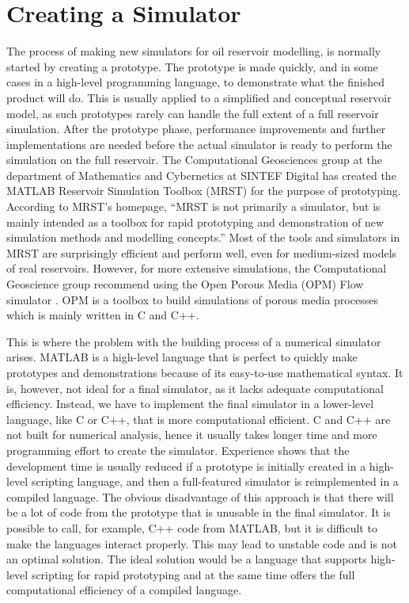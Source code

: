 \section{Creating a Simulator}
The process of making new simulators for oil reservoir modelling, is normally started by creating a prototype. The prototype is made quickly, and in some cases in a high-level programming language, to demonstrate what the finished product will do. This is usually applied to a simplified and conceptual reservoir model, as such prototypes rarely can handle the full extent of a full reservoir simulation. After the prototype phase, performance improvements and further implementations are needed before the actual simulator is ready to perform the simulation on the full reservoir. The Computational Geosciences group at the department of Mathematics and Cybernetics at SINTEF Digital has created the MATLAB Reservoir Simulation Toolbox (MRST) \emph{\citep{mrstHomepage}} for the  purpose of prototyping. According to MRST's homepage, \enquote{MRST is not primarily a simulator, but is mainly intended as a toolbox for rapid prototyping and demonstration of new simulation methods and modelling concepts.} Most of the tools and simulators in MRST are surprisingly efficient and perform well, even for medium-sized models of real reservoirs. However, for more extensive simulations, the Computational Geoscience group recommend using the Open Porous Media (OPM) Flow simulator \emph{\citep{opm}}. OPM is a toolbox to build simulations of porous media processes which is mainly written in C and C++. 

This is where the problem with the building process of a numerical simulator arises. MATLAB is a high-level language that is perfect to quickly make prototypes and demonstrations because of its easy-to-use mathematical syntax. It is, however, not ideal for a final simulator, as it lacks adequate computational efficiency. Instead, we have to implement the final simulator in a lower-level language, like C or C++, that is more computational efficient. C and C++ are not built for numerical analysis, hence it usually takes longer time and more programming effort to create the simulator. Experience shows that the development time is usually reduced if a prototype is initially created in a high-level scripting language, and then a full-featured simulator is reimplemented in a compiled language. The obvious disadvantage of this approach is that there will be a lot of code from the prototype that is unusable in the final simulator. It is possible to call, for example, C++ code from MATLAB, but it is difficult to make the languages interact properly. This may lead to unstable code and is not an optimal solution. The ideal solution would be a language that supports high-level scripting for rapid prototyping and at the same time offers the full computational efficiency of a compiled language.

